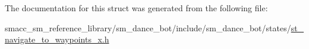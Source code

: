 The documentation for this struct was generated from the following file\+:\begin{DoxyCompactItemize}
\item 
smacc\+\_\+sm\+\_\+reference\+\_\+library/sm\+\_\+dance\+\_\+bot/include/sm\+\_\+dance\+\_\+bot/states/\hyperlink{st__navigate__to__waypoints__x_8h}{st\+\_\+navigate\+\_\+to\+\_\+waypoints\+\_\+x.\+h}\end{DoxyCompactItemize}
